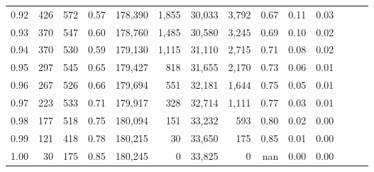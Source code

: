 \begin{tabular}{rrrrrrrrrrrrrr}
0.92 &    426 &  572 &  0.57 &  178,390 &    1,855 &  30,033 &   3,792 &  0.67 &  0.11 &      0.03 \\
0.93 &    370 &  547 &  0.60 &  178,760 &    1,485 &  30,580 &   3,245 &  0.69 &  0.10 &      0.02 \\
0.94 &    370 &  530 &  0.59 &  179,130 &    1,115 &  31,110 &   2,715 &  0.71 &  0.08 &      0.02 \\
0.95 &    297 &  545 &  0.65 &  179,427 &      818 &  31,655 &   2,170 &  0.73 &  0.06 &      0.01 \\
0.96 &    267 &  526 &  0.66 &  179,694 &      551 &  32,181 &   1,644 &  0.75 &  0.05 &      0.01 \\
0.97 &    223 &  533 &  0.71 &  179,917 &      328 &  32,714 &   1,111 &  0.77 &  0.03 &      0.01 \\
0.98 &    177 &  518 &  0.75 &  180,094 &      151 &  33,232 &     593 &  0.80 &  0.02 &      0.00 \\
0.99 &    121 &  418 &  0.78 &  180,215 &       30 &  33,650 &     175 &  0.85 &  0.01 &      0.00 \\
1.00 &     30 &  175 &  0.85 &  180,245 &        0 &  33,825 &       0 &   nan &  0.00 &      0.00 \\
\bottomrule
\end{tabular}
